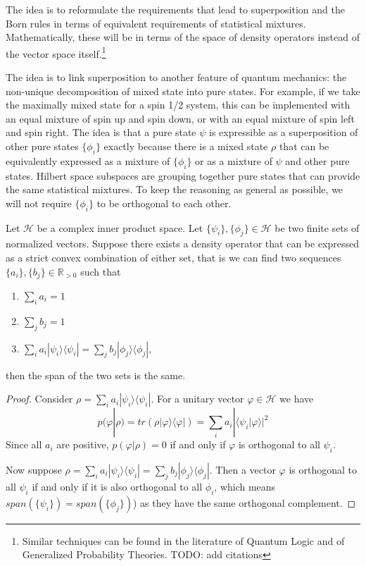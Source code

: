 \documentclass[10pt,twocolumn, nofootinbib]{revtex4-2}
\def\>{\rangle}
\def\<{\langle}
\begin{document}
The idea is to reformulate the requirements that lead to superposition and the Born rules in terms of equivalent requirements of statistical mixtures. Mathematically, these will be in terms of the space of density operators instead of the vector space itself.\footnote{Similar techniques can be found in the literature of Quantum Logic and of Generalized Probability Theories. TODO: add citations}

The idea is to link superposition to another feature of quantum mechanics: the non-unique decomposition of mixed state into pure states. For example, if we take the maximally mixed state for a spin 1/2 system, this can be implemented with an equal mixture of spin up and spin down, or with an equal mixture of spin left and spin right. The idea is that a pure state $\psi$ is expressible as a superposition of other pure states $\{\phi_i\}$ exactly because there is a mixed state $\rho$ that can be equivalently expressed as a mixture of $\{\phi_i\}$ or as a mixture of $\psi$ and other pure states. Hilbert space subspaces are grouping together pure states that can provide the same statistical mixtures. To keep the reasoning as general as possible, we will not require $\{\phi_i\}$ to be orthogonal to each other.

\begin{prop}\label{prop_densitySpan}
	Let $\mathcal{H}$ be a complex inner product space. Let $\{\psi_i\}, \{\phi_j\} \in \mathcal{H}$ be two finite sets of normalized vectors. Suppose there exists a density operator that can be expressed as a strict convex combination of either set, that is we can find two sequences $\{a_i\}, \{b_j\} \in \mathbb{R}_{>0}$ such that
	\begin{enumerate}
		\item $\sum_i a_i = 1$
		\item $\sum_j b_j = 1$
		\item $\sum_i a_i |\psi_i\>\<\psi_i| = \sum_j b_j |\phi_j\>\<\phi_j|$,
	\end{enumerate}
	then the span of the two sets is the same.
\end{prop}

\begin{proof}
	Consider $\rho = \sum_i a_i |\psi_i\>\<\psi_i|$. For a unitary vector $\varphi \in \mathcal{H}$ we have
	$$p(\varphi|\rho)=tr(\rho |\varphi\>\<\varphi|) =  \sum_i a_i |\<\psi_i|\varphi\>|^2$$
	Since all $a_i$ are positive, $p(\varphi|\rho) = 0$ if and only if $\varphi$ is orthogonal to all $\psi_i$.
	
	Now suppose $\rho = \sum_i a_i |\psi_i\>\<\psi_i| = \sum_j b_j |\phi_j\>\<\phi_j|$. Then a vector $\varphi$ is orthogonal to all $\psi_i$ if and only if it is also orthogonal to all $\phi_i$, which means $span(\{\psi_i\}) = span(\{\phi_j\})$) as they have the same orthogonal complement.
\end{proof}
\end{document}
